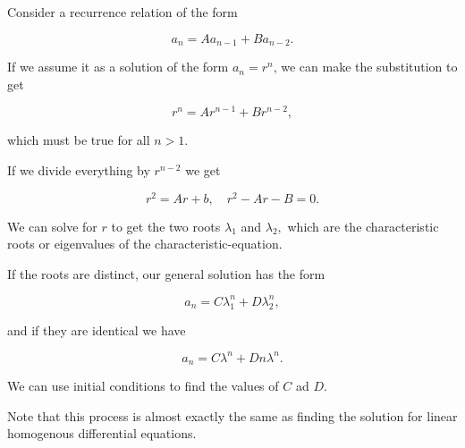 \documentclass{article}
\begin{document}
Consider a recurrence relation of the form

\[ a_n = A a_{n-1} + B a_{n-2}. \]

If we assume it as a solution of the form $a_n = r^n$, we can make the substitution to get

\[ r^n = Ar^{n-1} + Br^{n-2}, \]

which must be true for all $n > 1.$

If we divide everything by $r^{n-2}$ we get

\[ r^2 = Ar + b, \quad r^2 - Ar - B = 0. \]

We can solve for $r$ to get the two roots $\lambda_1$ and $\lambda_2,$ which are the characteristic roots or eigenvalues of the \@{characteristic-equation}.

If the roots are distinct, our general solution has the form

\[ a_n = C \lambda_1^n + D \lambda_2^n, \]

and if they are identical we have

\[ a_n = C \lambda^n + D n \lambda^n. \]

We can use initial conditions to find the values of $C$ ad $D.$

Note that this process is almost exactly the same as finding the solution for linear homogenous differential equations.
\end{document}
